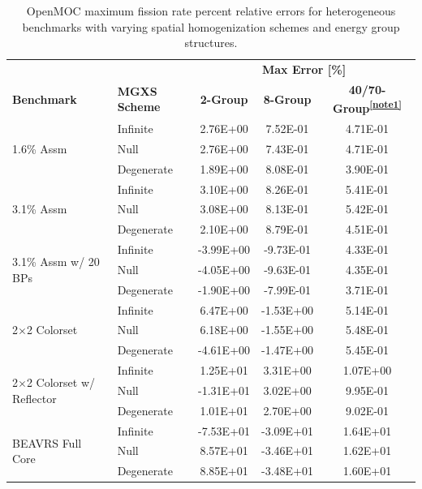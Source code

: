 \begin{table}[ht!]
  \centering
  \caption[Maximum OpenMOC fission rate errors]{OpenMOC maximum fission rate percent relative errors for heterogeneous benchmarks with varying spatial homogenization schemes and energy group structures.}
  \small
  \label{table:chap8-openmoc-max-fiss-rates}
  \vspace{6pt}
  \begin{tabular}{l l c c c}
  \toprule
  \rowcolor{lightgray}
  & & \multicolumn{3}{c}{\cellcolor{lightgray} \textbf{Max Error [\%]}} \\
  \multirow{-2}{*}{\cellcolor{lightgray} \bf Benchmark} &
  \multirow{-2}{*}{\cellcolor{lightgray} \bf \ac{MGXS} Scheme} &
  \multicolumn{1}{c}{{\cellcolor{lightgray} \bf 2-Group}} &
  \multicolumn{1}{c}{{\cellcolor{lightgray} \bf 8-Group}} &
  \multicolumn{1}{c}{{\cellcolor{lightgray} \bf 40/70-Group\textsuperscript{\ref{note1}}}} \\
  \midrule
\multirow{3}{*}{\parbox{2.5cm}{1.6\% Assm}} & Infinite & 2.76E+00 & 7.52E-01 & 4.71E-01 \\
& Null & 2.76E+00 & 7.43E-01 & 4.71E-01 \\
& Degenerate & 1.89E+00 & 8.08E-01 & 3.90E-01 \\
  \midrule
\multirow{3}{*}{\parbox{2.5cm}{3.1\% Assm}} & Infinite & 3.10E+00 & 8.26E-01 & 5.41E-01 \\
& Null & 3.08E+00 & 8.13E-01 & 5.42E-01 \\
& Degenerate & 2.10E+00 & 8.79E-01 & 4.51E-01 \\
  \midrule
\multirow{3}{*}{\parbox{2.5cm}{3.1\% Assm w/ 20 BPs}} & Infinite & -3.99E+00 & -9.73E-01 & 4.33E-01 \\
& Null & -4.05E+00 & -9.63E-01 & 4.35E-01 \\
& Degenerate & -1.90E+00 & -7.99E-01 & 3.71E-01 \\
  \midrule
\multirow{3}{*}{\parbox{2.5cm}{2$\times$2 Colorset}} & Infinite & 6.47E+00 & -1.53E+00 & 5.14E-01 \\
& Null & 6.18E+00 & -1.55E+00 & 5.48E-01 \\
& Degenerate & -4.61E+00 & -1.47E+00 & 5.45E-01 \\
  \midrule
\multirow{3}{*}{\parbox{2.5cm}{2$\times$2 Colorset w/ Reflector}} & Infinite & 1.25E+01 & 3.31E+00 & 1.07E+00 \\
& Null & -1.31E+01 & 3.02E+00 & 9.95E-01 \\
& Degenerate & 1.01E+01 & 2.70E+00 & 9.02E-01 \\
  \midrule
\multirow{3}{*}{\parbox{2.5cm}{BEAVRS Full Core}} & Infinite & -7.53E+01 & -3.09E+01 & 1.64E+01 \\
& Null & 8.57E+01 & -3.46E+01 & 1.62E+01 \\
& Degenerate & 8.85E+01 & -3.48E+01 & 1.60E+01 \\
  \bottomrule
\end{tabular}
\end{table}

